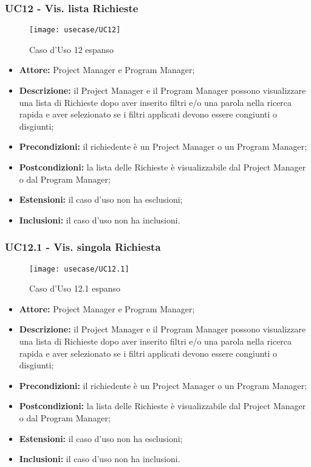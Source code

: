 \subsubsection*{UC12 - Vis. lista Richieste}

\begin{figure}[H] 
    \centering 
    \texttt{[image: usecase/UC12]} 
    \caption{Caso d'Uso 12 espanso}
\end{figure}

\begin{itemize}[label=$\circ$]
\item \textbf{Attore:} Project Manager e Program Manager;
\item \textbf{Descrizione:} il Project Manager e il Program Manager possono visualizzare una lista di Richieste dopo aver inserito filtri e/o una parola nella ricerca rapida e aver selezionato se i filtri applicati devono essere congiunti o disgiunti;
\item \textbf{Precondizioni:} il richiedente è un Project Manager o un Program Manager;
\item \textbf{Postcondizioni:} la lista delle Richieste è visualizzabile dal Project Manager o dal Program Manager;
\item \textbf{Estensioni:} il caso d'uso non ha esclusioni;
\item \textbf{Inclusioni:} il caso d'uso non ha inclusioni.
\end{itemize}

\subsubsection*{UC12.1 - Vis. singola Richiesta}

\begin{figure}[H] 
    \centering 
    \texttt{[image: usecase/UC12.1]} 
    \caption{Caso d'Uso 12.1 espanso}
\end{figure}

\begin{itemize}[label=$\circ$]
\item \textbf{Attore:} Project Manager e Program Manager;
\item \textbf{Descrizione:} il Project Manager e il Program Manager possono visualizzare una lista di Richieste dopo aver inserito filtri e/o una parola nella ricerca rapida e aver selezionato se i filtri applicati devono essere congiunti o disgiunti;
\item \textbf{Precondizioni:} il richiedente è un Project Manager o un Program Manager;
\item \textbf{Postcondizioni:} la lista delle Richieste è visualizzabile dal Project Manager o dal Program Manager;
\item \textbf{Estensioni:} il caso d'uso non ha esclusioni;
\item \textbf{Inclusioni:} il caso d'uso non ha inclusioni.
\end{itemize}

